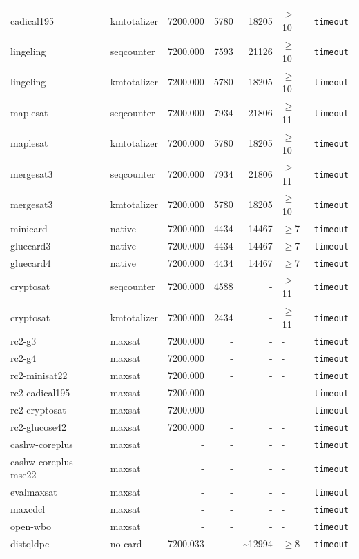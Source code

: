 \begin{longtable}{llrrrl p{}}
cadical195 & kmtotalizer & 7200.000 & 5780 & 18205 & $\geq$10 & \texttt{timeout} \\
lingeling & seqcounter & 7200.000 & 7593 & 21126 & $\geq$10 & \texttt{timeout} \\
lingeling & kmtotalizer & 7200.000 & 5780 & 18205 & $\geq$10 & \texttt{timeout} \\
maplesat & seqcounter & 7200.000 & 7934 & 21806 & $\geq$11 & \texttt{timeout} \\
maplesat & kmtotalizer & 7200.000 & 5780 & 18205 & $\geq$10 & \texttt{timeout} \\
mergesat3 & seqcounter & 7200.000 & 7934 & 21806 & $\geq$11 & \texttt{timeout} \\
mergesat3 & kmtotalizer & 7200.000 & 5780 & 18205 & $\geq$10 & \texttt{timeout} \\
minicard & native & 7200.000 & 4434 & 14467 & $\geq$7 & \texttt{timeout} \\
gluecard3 & native & 7200.000 & 4434 & 14467 & $\geq$7 & \texttt{timeout} \\
gluecard4 & native & 7200.000 & 4434 & 14467 & $\geq$7 & \texttt{timeout} \\
cryptosat & seqcounter & 7200.000 & 4588 & - & $\geq$11 & \texttt{timeout} \\
cryptosat & kmtotalizer & 7200.000 & 2434 & - & $\geq$11 & \texttt{timeout} \\
rc2-g3 & maxsat & 7200.000 & - & - & - & \texttt{timeout} \\
rc2-g4 & maxsat & 7200.000 & - & - & - & \texttt{timeout} \\
rc2-minisat22 & maxsat & 7200.000 & - & - & - & \texttt{timeout} \\
rc2-cadical195 & maxsat & 7200.000 & - & - & - & \texttt{timeout} \\
rc2-cryptosat & maxsat & 7200.000 & - & - & - & \texttt{timeout} \\
rc2-glucose42 & maxsat & 7200.000 & - & - & - & \texttt{timeout} \\
cashw-coreplus & maxsat & - & - & - & - & \texttt{timeout} \\
cashw-coreplus-mse22 & maxsat & - & - & - & - & \texttt{timeout} \\
evalmaxsat & maxsat & - & - & - & - & \texttt{timeout} \\
maxcdcl & maxsat & - & - & - & - & \texttt{timeout} \\
open-wbo & maxsat & - & - & - & - & \texttt{timeout} \\
distqldpc & no-card & 7200.033 & - & \textasciitilde{}12994 & $\geq$8 & \texttt{timeout} \\

\end{longtable}
